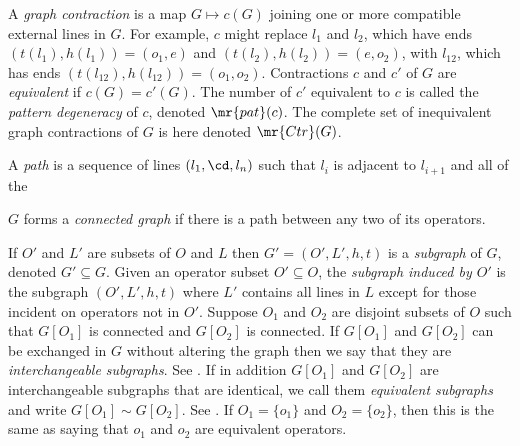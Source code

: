\documentclass[11pt,fleqn]{article}
\numberwithin{equation}{section}
\begin{document}
\begin{dfn}
A \textit{graph contraction} is a map $G\mapsto c(G)$ joining one or more compatible external lines in $G$.
For example, $c$ might replace $l_1$ and $l_2$, which have ends $(t(l_1),h(l_1))=(o_1,e)$ and $(t(l_2),h(l_2))=(e,o_2)$, with $l_{12}$, which has ends $(t(l_{12}),h(l_{12}))=(o_1,o_2)$.
Contractions $c$ and $c'$ of $G$ are \textit{equivalent} if $c(G)=c'(G)$.
The number of $c'$ equivalent to $c$ is called the \textit{pattern degeneracy} of $c$, denoted $\mr{pat}(c)$.
The complete set of inequivalent graph contractions of $G$ is here denoted $\mr{Ctr}(G)$.
\end{dfn}


\begin{dfn}
A \textit{path} is a sequence of lines $(l_1,\cd,l_n)$ such that $l_i$ is adjacent to $l_{i+1}$ and all of the 

$G$ forms a \textit{connected graph} if there is a path between any two of its operators.
\end{dfn}

\begin{dfn}
If $O'$ and $L'$ are subsets of $O$ and $L$ then $G'=(O',L',h,t)$ is a \textit{subgraph} of $G$, denoted $G'\subseteq G$.
Given an operator subset $O'\subseteq O$, the \textit{subgraph induced by $O'$} is the subgraph $(O',L',h,t)$ where $L'$ contains all lines in $L$ except for those incident on operators not in $O'$.
Suppose $O_1$ and $O_2$ are disjoint subsets of $O$ such that $G[O_1]$ is connected and $G[O_2]$ is connected.
If $G[O_1]$ and $G[O_2]$ can be exchanged in $G$ without altering the graph then we say that they are \textit{interchangeable subgraphs}.
See .
If in addition $G[O_1]$ and $G[O_2]$ are interchangeable subgraphs that are identical, we call them \textit{equivalent subgraphs} and write $G[O_1]\sim G[O_2]$.
See .
If $O_1=\{o_1\}$ and $O_2=\{o_2\}$, then this is the same as saying that $o_1$ and $o_2$ are equivalent operators.
\end{dfn}
\end{document}

